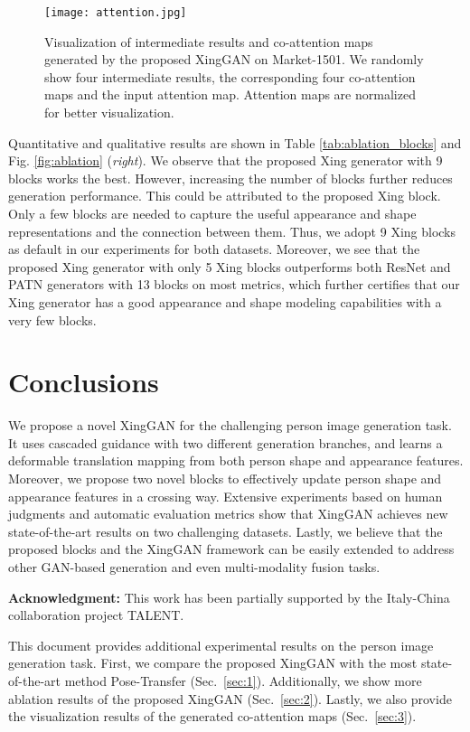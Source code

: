 \documentclass[runningheads]{llncs}
\begin{document}
\begin{figure}[!t]
	\centering
	\texttt{[image: attention.jpg]}
	\caption{Visualization of intermediate results and co-attention maps generated by the proposed XingGAN on Market-1501. We randomly show four intermediate results, the corresponding four co-attention maps and the input attention map. Attention maps are normalized for better visualization.}
	\label{fig:attention_map}
\end{figure}

Quantitative and qualitative results are shown in Table \ref{tab:ablation_blocks} and Fig. \ref{fig:ablation} (\textit{right}).
We observe that the proposed Xing generator with 9 blocks works the best. 
However, increasing the number of blocks further reduces generation performance.
This could be attributed to the proposed Xing block. Only a few blocks are needed to capture the useful appearance and shape representations and the connection between them.
Thus, we adopt 9 Xing blocks as default in our experiments for both datasets.
Moreover, we see that the proposed Xing generator with only 5 Xing blocks outperforms both ResNet and PATN generators with 13 blocks on most metrics, which further certifies that our Xing generator has a good appearance and shape modeling capabilities with a very few blocks.
 \section{Conclusions}
We propose a novel XingGAN for the challenging person image generation task.
It uses cascaded guidance with two different generation branches, and learns a deformable translation mapping from both person shape and appearance features.
Moreover, we propose two novel blocks to effectively update person shape and appearance features in a crossing way.
Extensive experiments based on human judgments and automatic evaluation metrics show that XingGAN achieves new state-of-the-art results on two challenging datasets.
Lastly, we believe that the proposed blocks and the XingGAN framework can be easily extended to address other GAN-based generation and even multi-modality fusion tasks.

\noindent \textbf{Acknowledgment:} This work has been partially supported by the Italy-China collaboration project TALENT. 
\clearpage



\clearpage
This document  provides additional experimental results on the person image generation task. 
First, we compare the proposed XingGAN with  the most state-of-the-art method Pose-Transfer \cite{zhu2019progressive} (Sec.~\ref{sec:1}).
Additionally, we show more  ablation results of the proposed XingGAN (Sec.~\ref{sec:2}). 
Lastly, we also provide the visualization results of the generated co-attention maps (Sec.~\ref{sec:3}). 
\end{document}
